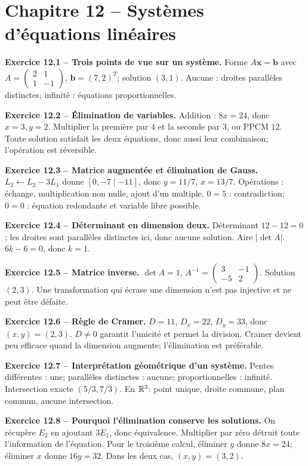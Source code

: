 \chapter*{Chapitre 12 -- Systèmes d'équations linéaires}
\begin{answerbox}
\textbf{Exercice 12.1 -- Trois points de vue sur un système.} Forme $A\mathbf x=\mathbf b$ avec $A=\begin{pmatrix}2&1\\1&-1\end{pmatrix}$, $\mathbf b=(7,2)^T$; solution $(3,1)$. Aucune : droites parallèles distinctes; infinité : équations proportionnelles.\par
\textbf{Exercice 12.2 -- Élimination de variables.} Addition : $8x=24$, donc $x=3,y=2$. Multiplier la première par $4$ et la seconde par $3$, ou PPCM $12$. Toute solution satisfait les deux équations, donc aussi leur combinaison; l'opération est réversible.\par
\textbf{Exercice 12.3 -- Matrice augmentée et élimination de Gauss.} $L_2\leftarrow L_2-3L_1$ donne $[0,-7\mid-11]$, donc $y=11/7$, $x=13/7$. Opérations : échange, multiplication non nulle, ajout d'un multiple. $0=5$ : contradiction; $0=0$ : équation redondante et variable libre possible.\par
\textbf{Exercice 12.4 -- Déterminant en dimension deux.} Déterminant $12-12=0$; les droites sont parallèles distinctes ici, donc aucune solution. Aire $|\det A|$. $6k-6=0$, donc $k=1$.\par
\textbf{Exercice 12.5 -- Matrice inverse.} $\det A=1$, $A^{-1}=\begin{pmatrix}3&-1\\-5&2\end{pmatrix}$. Solution $(2,3)$. Une transformation qui écrase une dimension n'est pas injective et ne peut être défaite.\par
\textbf{Exercice 12.6 -- Règle de Cramer.} $D=11$, $D_x=22$, $D_y=33$, donc $(x,y)=(2,3)$. $D\neq0$ garantit l'unicité et permet la division. Cramer devient peu efficace quand la dimension augmente; l'élimination est préférable.\par
\textbf{Exercice 12.7 -- Interprétation géométrique d'un système.} Pentes différentes : une; parallèles distinctes : aucune; proportionnelles : infinité. Intersection exacte $(5/3,7/3)$. En $\mathbb{R}^3$: point unique, droite commune, plan commun, aucune intersection.\par
\textbf{Exercice 12.8 -- Pourquoi l'élimination conserve les solutions.} On récupère $E_2$ en ajoutant $3E_1$, donc équivalence. Multiplier par zéro détruit toute l'information de l'équation. Pour le troisième calcul, éliminer $y$ donne $8x=24$; éliminer $x$ donne $16y=32$. Dans les deux cas, $(x,y)=(3,2)$.\par

\end{answerbox}

